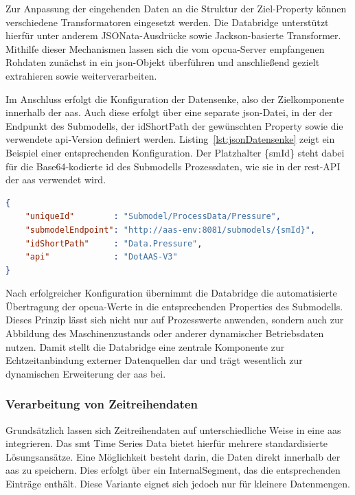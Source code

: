 Zur Anpassung der eingehenden Daten an die Struktur der Ziel-Property können verschiedene Transformatoren eingesetzt werden.
Die Databridge unterstützt hierfür unter anderem JSONata-Ausdrücke sowie Jackson-basierte Transformer.
Mithilfe dieser Mechanismen lassen sich die vom \acs{opcua}-Server empfangenen Rohdaten zunächst in ein \acs{json}-Objekt überführen und anschließend gezielt extrahieren sowie weiterverarbeiten.

Im Anschluss erfolgt die Konfiguration der Datensenke, also der Zielkomponente innerhalb der \acs{aas}.
Auch diese erfolgt über eine separate \acs{json}-Datei, in der der Endpunkt des Submodells, der idShortPath der gewünschten Property sowie die verwendete \acs{api}-Version definiert werden.
Listing~\ref{lst:jsonDatensenke} zeigt ein Beispiel einer entsprechenden Konfiguration.
Der Platzhalter \{smId\} steht dabei für die Base64-kodierte \acs{id} des Submodells Prozessdaten, wie sie in der \acs{rest}-API der \acs{aas} verwendet wird.

\newpage
\begin{lstlisting}[language=json, caption={Beispielhafte \acs{json}-Konfiguration einer Datensenke}, label={lst:jsonDatensenke}]
{
    "uniqueId"        : "Submodel/ProcessData/Pressure",
    "submodelEndpoint": "http://aas-env:8081/submodels/{smId}",
    "idShortPath"     : "Data.Pressure",
    "api"             : "DotAAS-V3"
}
\end{lstlisting}

Nach erfolgreicher Konfiguration übernimmt die Databridge die automatisierte Übertragung der \acs{opcua}-Werte in die entsprechenden Properties des Submodells.
Dieses Prinzip lässt sich nicht nur auf Prozesswerte anwenden, sondern auch zur Abbildung des Maschinenzustands oder anderer dynamischer Betriebsdaten nutzen.
Damit stellt die Databridge eine zentrale Komponente zur Echtzeitanbindung externer Datenquellen dar und trägt wesentlich zur dynamischen Erweiterung der \acs{aas} bei.

\subsubsection{Verarbeitung von Zeitreihendaten}
\label{sec: VerarbeitungZeitreihen}
Grundsätzlich lassen sich Zeitreihendaten auf unterschiedliche Weise in eine \acs{aas} integrieren.
Das \acs{smt} Time Series Data \cite{SpezifikationTimeSeriesData} bietet hierfür mehrere standardisierte Lösungsansätze.
Eine Möglichkeit besteht darin, die Daten direkt innerhalb der \acs{aas} zu speichern. 
Dies erfolgt über ein InternalSegment, das die entsprechenden Einträge enthält.
Diese Variante eignet sich jedoch nur für kleinere Datenmengen.

